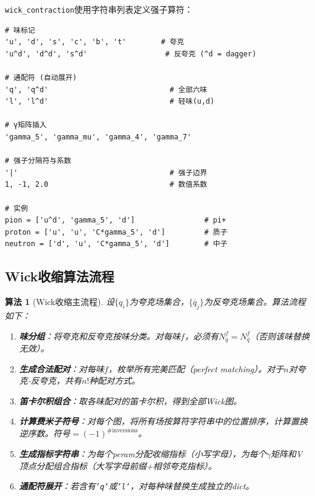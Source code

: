 \documentclass[11pt,a4paper]{ctexart}
\newtheorem{algorithm}{算法}[section]
\begin{document}
\texttt{wick\_contraction}使用字符串列表定义强子算符：

\begin{codebox}[算符格式约定]
\begin{lstlisting}[style=python]
# 味标记
'u', 'd', 's', 'c', 'b', 't'        # 夸克
'u^d', 'd^d', 's^d'                  # 反夸克 (^d = dagger)

# 通配符 (自动展开)
'q', 'q^d'                            # 全部六味
'l', 'l^d'                            # 轻味(u,d)

# γ矩阵插入
'gamma_5', 'gamma_mu', 'gamma_4', 'gamma_7'

# 强子分隔符与系数
'|'                                   # 强子边界
1, -1, 2.0                            # 数值系数

# 实例
pion = ['u^d', 'gamma_5', 'd']                # pi+
proton = ['u', 'u', 'C*gamma_5', 'd']         # 质子
neutron = ['d', 'u', 'C*gamma_5', 'd']        # 中子
\end{lstlisting}
\end{codebox}

\subsection{Wick收缩算法流程}

\begin{algorithm}[Wick收缩主流程]
设$\{q_i\}$为夸克场集合，$\{\bar{q}_j\}$为反夸克场集合。算法流程如下：
\begin{enumerate}
\item \textbf{味分组}：将夸克和反夸克按味分类。对每味$f$，必须有$N_q^f = N_{\bar{q}}^f$（否则该味替换无效）。
\item \textbf{生成合法配对}：对每味$f$，枚举所有完美匹配（perfect matching）。对于$n$对夸克-反夸克，共有$n!$种配对方式。
\item \textbf{笛卡尔积组合}：取各味配对的笛卡尔积，得到全部Wick图。
\item \textbf{计算费米子符号}：对每个图，将所有场按算符字符串中的位置排序，计算置换逆序数。符号$=(-1)^{\#\text{inversions}}$。
\item \textbf{生成指标字符串}：为每个peram分配收缩指标（小写字母），为每个$\gamma$矩阵和V顶点分配组合指标（大写字母前缀+相邻夸克指标）。
\item \textbf{通配符展开}：若含有\texttt{'q'}或\texttt{'l'}，对每种味替换生成独立的dict。
\end{enumerate}
\end{algorithm}
\end{document}
